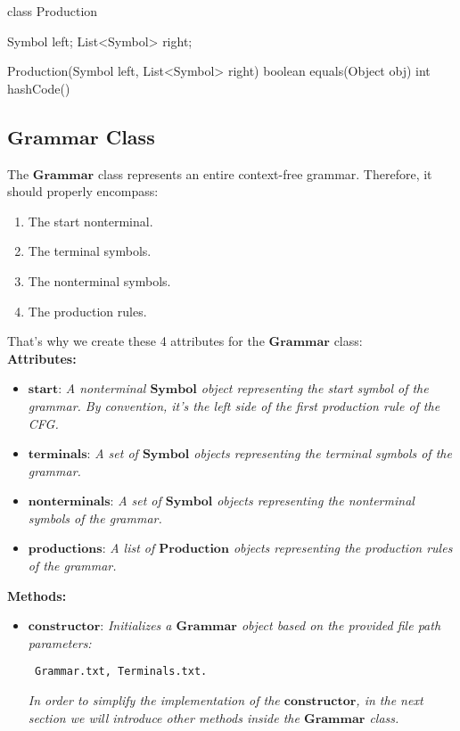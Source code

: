 \begin{codeblock}
    class Production {
        Symbol left;
        List<Symbol> right;

        Production(Symbol left, List<Symbol> right) {}
        boolean equals(Object obj) {}
        int hashCode() {}
    }
\end{codeblock}

\vspace{10pt}

\subsection*{\(\boldsymbol{Grammar}\) Class}

The \(\boldsymbol{Grammar}\) class represents an entire context-free grammar. Therefore, it should properly encompass:

\begin{enumerate}
    \item The start nonterminal.
    \item The terminal symbols.
    \item The nonterminal symbols.
    \item The production rules.
\end{enumerate}

That’s why we create these 4 attributes for the \(\boldsymbol{Grammar}\) class:\\

\textbf{Attributes:}
\begin{itemize}
    \item \(\boldsymbol{start}\): \textit{A nonterminal \(\boldsymbol{Symbol}\) object representing the start symbol of the grammar. By convention, it’s the left side of the first production rule of the CFG.}
    \item \(\boldsymbol{terminals}\): \textit{A set of \(\boldsymbol{Symbol}\) objects representing the terminal symbols of the grammar.}
    \item \(\boldsymbol{nonterminals}\): \textit{A set of \(\boldsymbol{Symbol}\) objects representing the nonterminal symbols of the grammar.}
    \item \(\boldsymbol{productions}\): \textit{A list of \(\boldsymbol{Production}\) objects representing the production rules of the grammar.}
\end{itemize}

\textbf{Methods:}
\begin{itemize}
    \item \(\boldsymbol{constructor}\): \textit{Initializes a \(\boldsymbol{Grammar}\) object based on the provided file path parameters:}
    \begin{verbatim} Grammar.txt, Terminals.txt.\end{verbatim}
    \textit{In order to simplify the implementation of the \(\boldsymbol{constructor}\), in the next section we will introduce other methods inside the \(\boldsymbol{Grammar}\) class.}
\end{itemize}

